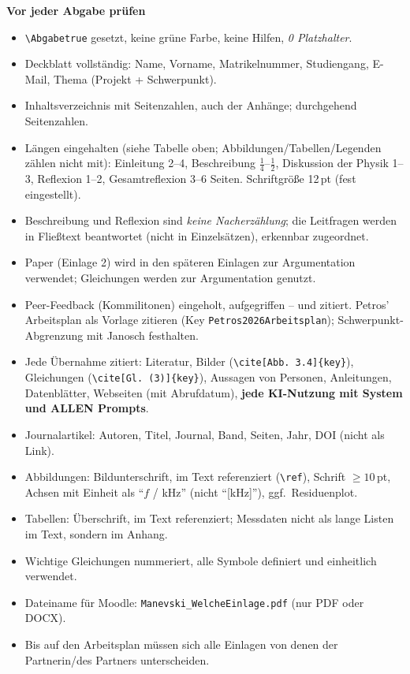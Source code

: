 \textbf{Vor jeder Abgabe prüfen}
\begin{itemize}\itemsep0pt
\item \texttt{\textbackslash Abgabetrue} gesetzt, keine grüne Farbe, keine Hilfen, \emph{0 Platzhalter}.
\item Deckblatt vollständig: Name, Vorname, Matrikelnummer, Studiengang, E-Mail, Thema (Projekt + Schwerpunkt).
\item Inhaltsverzeichnis mit Seitenzahlen, auch der Anhänge; durchgehend Seitenzahlen.
\item Längen eingehalten (siehe Tabelle oben; Abbildungen/Tabellen/Legenden zählen nicht mit):
      Einleitung 2--4, Beschreibung $\tfrac14$--$\tfrac12$, Diskussion der Physik 1--3,
      Reflexion 1--2, Gesamtreflexion 3--6 Seiten. Schriftgröße 12\,pt (fest eingestellt).
\item Beschreibung und Reflexion sind \emph{keine Nacherzählung}; die Leitfragen werden in Fließtext
      beantwortet (nicht in Einzelsätzen), erkennbar zugeordnet.
\item Paper (Einlage 2) wird in den späteren Einlagen zur Argumentation verwendet; Gleichungen werden
      zur Argumentation genutzt.
\item Peer-Feedback (Kommilitonen) eingeholt, aufgegriffen -- und zitiert. Petros' Arbeitsplan als Vorlage
      zitieren (Key \texttt{Petros2026Arbeitsplan}); Schwerpunkt-Abgrenzung mit Janosch festhalten.
\item Jede Übernahme zitiert: Literatur, Bilder (\texttt{\textbackslash cite[Abb.~3.4]\{key\}}),
      Gleichungen (\texttt{\textbackslash cite[Gl.~(3)]\{key\}}), Aussagen von Personen, Anleitungen,
      Datenblätter, Webseiten (mit Abrufdatum), \textbf{jede KI-Nutzung mit System und ALLEN Prompts}.
\item Journalartikel: Autoren, Titel, Journal, Band, Seiten, Jahr, DOI (nicht als Link).
\item Abbildungen: Bildunterschrift, im Text referenziert (\texttt{\textbackslash ref}), Schrift
      $\geq 10$\,pt, Achsen mit Einheit als \enquote{$f$ / kHz} (nicht \enquote{[kHz]}), ggf.\ Residuenplot.
\item Tabellen: Überschrift, im Text referenziert; Messdaten nicht als lange Listen im Text, sondern im Anhang.
\item Wichtige Gleichungen nummeriert, alle Symbole definiert und einheitlich verwendet.
\item Dateiname für Moodle: \texttt{Manevski\_WelcheEinlage.pdf} (nur PDF oder DOCX).
\item Bis auf den Arbeitsplan müssen sich alle Einlagen von denen der Partnerin/des Partners unterscheiden.
\end{itemize}
